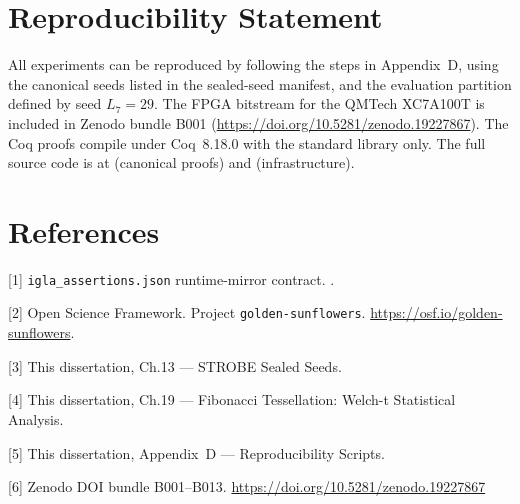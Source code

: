 \section{Reproducibility
Statement}\label{app_e:reproducibility}

All experiments can be reproduced by following the
steps in Appendix~D, using the canonical seeds
listed in the sealed-seed manifest, and the
evaluation partition defined by seed \(L_7 = 29\).
The FPGA bitstream for the QMTech XC7A100T is
included in Zenodo bundle B001
(\url{https://doi.org/10.5281/zenodo.19227867}).
The Coq proofs compile under Coq~8.18.0 with the
standard library only. The full source code is at
 (canonical proofs) and
 (infrastructure).

\section{References}\label{app_e:references}

[1] \texttt{igla\_assertions.json} runtime-mirror
contract.
.

[2] Open Science Framework. Project
\texttt{golden-sunflowers}.
\url{https://osf.io/golden-sunflowers}.

[3] This dissertation, Ch.13 --- STROBE Sealed
Seeds.

[4] This dissertation, Ch.19 --- Fibonacci
Tessellation: Welch-t Statistical Analysis.

[5] This dissertation, Appendix~D ---
Reproducibility Scripts.

[6] Zenodo DOI bundle B001--B013.
\url{https://doi.org/10.5281/zenodo.19227867}
